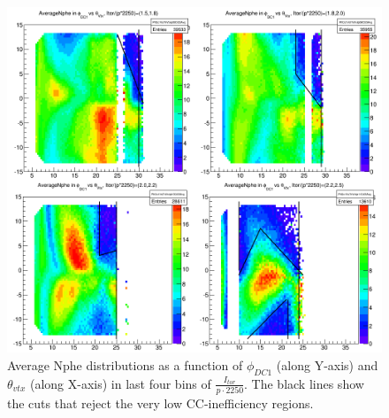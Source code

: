 \begin{figure}[H]%
\centering
\leavevmode \includegraphics[width=1.1\textwidth]{figuresEG4/NewP2/FidCuts/moreFiducialCutsMoreInversePBinsEbi2last4Bins.png}
\caption[Fiducial cuts (last 4 bins)]{Average Nphe  distributions as a function of $\phi_{DC1}$ (along Y-axis) and $\theta_{vtx}$ (along X-axis) in last four bins of $\frac{I_{tor}}{p \cdot 2250}$. The black lines show the cuts that reject the very low CC-inefficiency regions.}
\label{figFidAvgNph1}
\end{figure}
